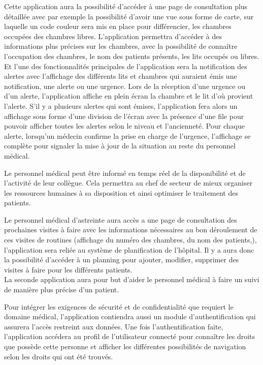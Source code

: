 Cette application aura la possibilité d’accéder à une page de consultation plus détaillée avec par exemple la possibilité d’avoir une vue sous forme de carte, sur laquelle un code couleur sera mis en place pour différencier, les chambres occupées des chambres libres. L’application permettra d’accéder à des informations plus précises sur les chambres, avec la possibilité de connaître l’occupation des chambres, le nom des patients présents, les lits occupés ou libres. Et l’une des fonctionnalités principales de l’application sera la notification des alertes avec l’affichage des différents lits et chambres qui auraient émis une notification, une alerte ou une urgence. Lors de la réception d’une urgence ou d’un alerte, l’application affiche en plein écran la chambre et le lit d’où provient l’alerte. S’il y a plusieurs alertes qui sont émises, l’application fera alors un affichage sous forme d’une division de l’écran avec la présence d’une file pour pouvoir afficher toutes les alertes selon le niveau et l’ancienneté. Pour chaque alerte, lorsqu’un médecin confirme la prise en charge de l’urgence, l’affichage se complète pour signaler la mise à jour de la situation au reste du personnel médical.

Le personnel médical peut être informé en temps réel de la disponibilité et de l’activité de leur collègue. Cela permettra au chef de secteur de mieux organiser les ressources humaines à sa disposition et ainsi optimiser le traitement des patients.

Le personnel médical d’astreinte aura accès a une page de consultation des prochaines visites à faire avec les informations nécessaires au bon déroulement de ces visites de routines (affichage du numéro des chambres, du nom des patients,), l’application sera reliée au système de planification de l’hôpital. Il y a aura donc la possibilité d’accéder à un planning pour ajouter, modifier, supprimer des visites à faire pour les différents patients.
\\

La seconde application aura pour but d’aider le personnel médical à faire un suivi de manière plus précise d’un patient.

Pour intégrer les exigences de sécurité et de confidentialité que requiert le domaine médical, l’application contiendra aussi un module d’authentification qui assurera l’accès restreint aux données. Une fois l’authentification faite, l’application accédera au profil de l’utilisateur connecté pour connaître les droits que possède cette personne et afficher les différentes possibilités de navigation selon les droits qui ont été trouvés.


